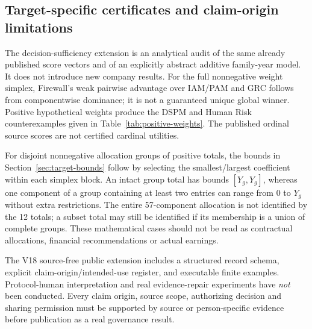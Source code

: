 \subsection{Target-specific certificates and claim-origin limitations}\label{app:v18-certificates}
The decision-sufficiency extension is an analytical audit of the same already published score vectors and of an explicitly abstract additive family-year model. It does not introduce new company results. For the full nonnegative weight simplex, Firewall's weak pairwise advantage over IAM/PAM and GRC follows from componentwise dominance; it is not a guaranteed unique global winner. Positive hypothetical weights produce the DSPM and Human Risk counterexamples given in Table~\ref{tab:positive-weights}. The published ordinal source scores are not certified cardinal utilities.\par
For disjoint nonnegative allocation groups of positive totals, the bounds in Section~\ref{sec:target-bounds} follow by selecting the smallest/largest coefficient within each simplex block. An intact group total has bounds $[Y_g,Y_g]$, whereas one component of a group containing at least two entries can range from $0$ to $Y_g$ without extra restrictions. The entire 57-component allocation is not identified by the 12 totals; a subset total may still be identified if its membership is a union of complete groups. These mathematical cases should not be read as contractual allocations, financial recommendations or actual earnings.\par
The V18 source-free public extension includes a structured record schema, explicit claim-origin/intended-use register, and executable finite examples. Protocol-human interpretation and real evidence-repair experiments have \emph{not} been conducted. Every claim origin, source scope, authorizing decision and sharing permission must be supported by source or person-specific evidence before publication as a real governance result.

\endgroup
